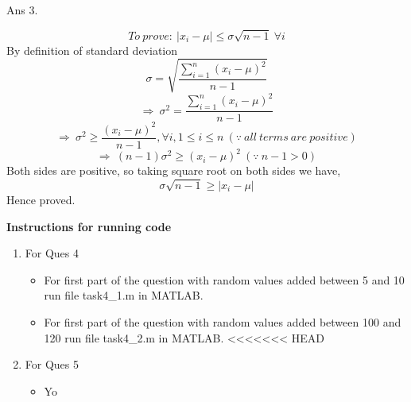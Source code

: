 \documentclass[11pt]{article}
\begin{document}
Ans 3.\begin{center}
$$To\ prove:\ |x_i - \mu| \le \sigma\sqrt{n-1}\ \forall i$$ \newline
By definition of standard deviation
$$\sigma = \sqrt{\frac{\sum\limits_{i=1}^n(x_i-\mu)^2}{n-1}}$$
$$\Rightarrow\ \sigma^2=\frac{\sum\limits_{i=1}^n(x_i-\mu)^2}{n-1}$$
$$\Rightarrow\ \sigma^2\ge\frac{(x_i-\mu)^2}{n-1}, \forall i,1\le i\le n\ (\because\ all\ terms\ are\ positive)$$
$$\Rightarrow\ (n-1)\sigma^2 \ge (x_i-\mu)^2\ (\because\ n-1 > 0)$$
Both sides are positive, so taking square root on both sides we have,
$$\sigma\sqrt{n-1} \ge |x_i-\mu|$$
Hence proved.

\vspace{50px}

\textbf{Instructions for running code}
\begin{enumerate}
\item For Ques 4
\begin{itemize}
\item For first part of the question with random values added between 5 and 10 run file task4\_1.m in MATLAB.
\item For first part of the question with random values added between 100 and 120 run file task4\_2.m in MATLAB.
<<<<<<< HEAD
\end{itemize}
\item For Ques 5
\begin{itemize}
\item Yo
\end{itemize}
\end{enumerate}
\end{center}
\end{document}
